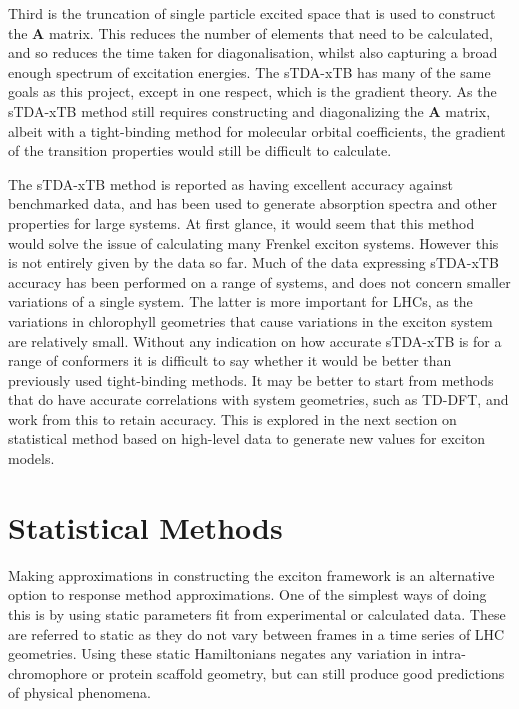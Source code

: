 Third is the truncation of single particle excited space that is used to construct 
the $\mathbf{A}$ matrix. This reduces the number of elements that need to be 
calculated, and so reduces the time taken for diagonalisation, whilst also capturing 
a broad enough spectrum of excitation energies. The sTDA-xTB has many of the same 
goals as this project, except in one respect, which is the gradient theory. As 
the sTDA-xTB method still requires constructing and diagonalizing the $\mathbf{A}$ 
matrix, albeit with a tight-binding method for molecular orbital coefficients, 
the gradient of the transition properties would still be difficult to calculate.

The sTDA-xTB method is reported as having excellent accuracy against benchmarked
data, and has been used to generate absorption spectra and other properties for 
large systems. At first glance, it would seem that this method would solve the issue
of calculating many Frenkel exciton systems. However this is not entirely given 
by the data so far. Much of the data expressing sTDA-xTB accuracy has been performed 
on a range of systems, and does not concern smaller variations of a single system. 
The latter is more important for LHCs, as the variations in chlorophyll geometries
that cause variations in the exciton system are relatively small. Without any indication
on how accurate sTDA-xTB is for a range of conformers it is difficult to say whether
it would be better than previously used tight-binding methods. It may be better 
to start from methods that do have accurate correlations with system geometries, 
such as TD-DFT, and work from this to retain accuracy. This is explored in the next
section on statistical method based on high-level data to generate new values for
exciton models.

\section{Statistical Methods}
\label{sec:stats_methods}

Making approximations in constructing the exciton framework is an alternative option
to response method approximations. One of the simplest ways of doing this is by 
using static parameters fit from experimental or calculated data. These are referred
to static as they do not vary between frames in a time series of LHC geometries. 
Using these static Hamiltonians negates any variation in intra-chromophore or protein
scaffold geometry, but can still produce good predictions of physical phenomena.

